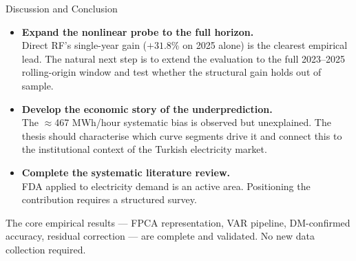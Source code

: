 \documentclass[10pt,aspectratio=169]{beamer}
\begin{document}
\begin{frame}{Discussion and Conclusion}
  \begin{itemize}
    \item \textbf{Expand the nonlinear probe to the full horizon.}\\[0.2em]
          {\small Direct RF's single-year gain ($+31.8\%$ on 2025 alone) is
          the clearest empirical lead. The natural next step is to extend
          the evaluation to the full 2023--2025 rolling-origin window
          and test whether the structural gain holds out of sample.}

    \vspace{0.5em}
    \item \textbf{Develop the economic story of the underprediction.}\\[0.2em]
          {\small The $\approx$467 MWh/hour systematic bias is observed but
          unexplained. The thesis should characterise which curve
          segments drive it and connect this to the institutional
          context of the Turkish electricity market.}

    \vspace{0.5em}
    \item \textbf{Complete the systematic literature review.}\\[0.2em]
          {\small FDA applied to electricity demand is an active area.
          Positioning the contribution requires a structured survey.}
  \end{itemize}

  \vspace{0.4em}
  \footnotesize The core empirical results --- FPCA representation,
  VAR pipeline, DM-confirmed accuracy, residual correction ---
  are complete and validated. No new data collection required.
\end{frame}
\end{document}
